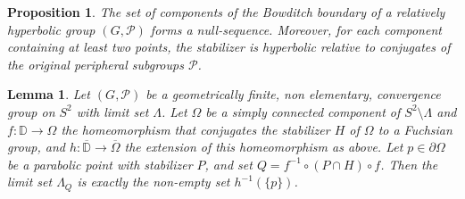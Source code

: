\documentclass[10pt,a4paper]{amsart}
\newtheorem{proposition}{Proposition}
\newtheorem{lemma}{Lemma}
\newcommand\PP{\mathcal{P}}
\begin{document}
\begin{proposition}\label{prop:infends} The set of components of the Bowditch boundary of a relatively hyperbolic group $(G,\PP)$ 
forms a null-sequence. Moreover, for each 
component containing at least two points, the stabilizer is hyperbolic relative to conjugates of the original
peripheral subgroups $\PP$. \end{proposition}

\begin{lemma}\label{lma:parabolicvsfuchs}  Let $(G, \PP)$ be a geometrically finite, non elementary, convergence group on $S^2$ with limit set $\Lambda$.  Let $\Omega$ be a simply connected component of $S^2 \setminus \Lambda$ and {$f:\mathbb{D}\to \Omega$ the homeomorphism that conjugates the stabilizer $H$ of $\Omega$} to a Fuchsian group, and $h:\overline{\mathbb{D}}\to\overline{\Omega}$ the extension of this homeomorphism as above. Let $p\in\partial\Omega$ be a parabolic point with stabilizer $P$, and set {$Q= f^{-1}\circ(P\cap H)\circ f$}. 
Then the limit set $\Lambda_Q$ is exactly the non-empty set  $h^{-1}(\{p\})$.
\end{lemma}
\end{document}
